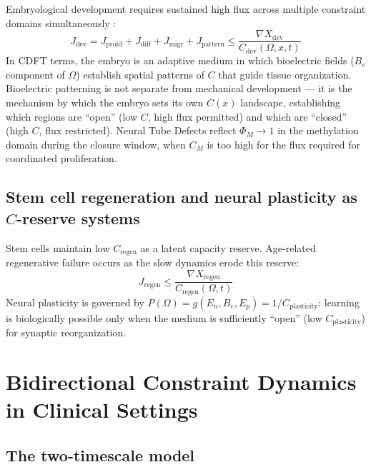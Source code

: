 \documentclass[11pt]{article}
\newcommand{\Om}{\Omega}
\begin{document}
Embryological development requires sustained high flux across multiple constraint domains simultaneously \citep{Levin2021,Levin2012,tseng2013}:
\begin{equation}
J_{\mathrm{dev}} = J_{\mathrm{prolif}} + J_{\mathrm{diff}} + J_{\mathrm{migr}} + J_{\mathrm{pattern}} \leq \frac{\nabla X_{\mathrm{dev}}}{C_{\mathrm{dev}}(\Om, x, t)}
\label{eq:jdev}
\end{equation}
In CDFT terms, the embryo is an adaptive medium in which bioelectric fields ($B_e$ component of $\Om$) establish spatial patterns of $C$ that guide tissue organization. Bioelectric patterning is not separate from mechanical development --- it is the mechanism by which the embryo sets its own $C(x)$ landscape, establishing which regions are ``open'' (low $C$, high flux permitted) and which are ``closed'' (high $C$, flux restricted). Neural Tube Defects reflect $\Phi_M \to 1$ in the methylation domain during the closure window, when $C_M$ is too high for the flux required for coordinated proliferation.

\subsection{Stem cell regeneration and neural plasticity as $C$-reserve systems}

Stem cells maintain low $C_{\mathrm{regen}}$ as a latent capacity reserve. Age-related regenerative failure occurs as the slow dynamics erode this reserve:
\begin{equation}
J_{\mathrm{regen}} \leq \frac{\nabla X_{\mathrm{regen}}}{C_{\mathrm{regen}}(\Om, t)}
\end{equation}
Neural plasticity is governed by $P(\Om) = g(E_n, B_e, E_p) = 1/C_{\mathrm{plasticity}}$: learning is biologically possible only when the medium is sufficiently ``open'' (low $C_{\mathrm{plasticity}}$) for synaptic reorganization.


\section{Bidirectional Constraint Dynamics in Clinical Settings}
\label{sec:bidir}

\subsection{The two-timescale model}
\end{document}
